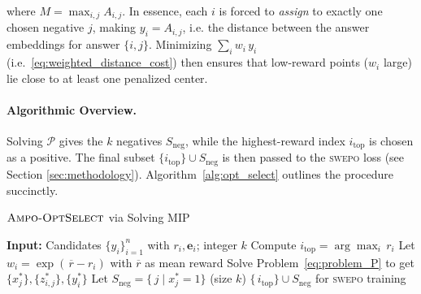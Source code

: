 \vspace{-0.1in}
where $M=\max_{i,j} A_{i,j}$. In essence, each $i$ is forced to \emph{assign} to exactly one chosen negative $j$, making $y_i = A_{i,j}$, i.e. the distance between the answer embeddings for answer $\{i,j\}$. Minimizing $\sum_i w_i\,y_i$ (i.e.\ \eqref{eq:weighted_distance_cost}) then ensures that low-reward points ($w_i$ large) lie close to at least one penalized center.

\vspace{-0.1in}
\paragraph{Algorithmic Overview.}
Solving $\mathcal{P}$ gives the $k$ negatives $S_{\mathrm{neg}}$, while the highest-reward index $i_{\mathrm{top}}$ is chosen as a positive. The final subset $\{i_{\mathrm{top}}\}\cup S_{\mathrm{neg}}$ is then passed to the \textsc{swepo} loss (see Section \ref{sec:methodology}). Algorithm~\ref{alg:opt_select} outlines the procedure succinctly.


\begin{algorithm}[t]
\caption{\textcolor{titlecolor}{$\textsc{Ampo-OptSelect}$ via Solving MIP}}
\label{alg:opt_select}
\begin{algorithmic}[1]
    \STATE \textcolor{inputcolor}{\textbf{Input:} Candidates $\{y_i\}_{i=1}^n$ with $r_i, \mathbf{e}_i$; integer $k$}
    \STATE \textcolor{mathcolor}{Compute $i_{\mathrm{top}} = \arg\max_i\,r_i$}
    \STATE \textcolor{mathcolor}{Let $w_i = \exp(\,\overline{r} - r_i)$ with $\overline{r}$ as mean reward}
    \STATE \textcolor{mathcolor}{Solve Problem~\eqref{eq:problem_P} to get $\{x_j^*\}, \{z_{i,j}^*\}, \{y_i^*\}$}
    \STATE \textcolor{mathcolor}{Let $S_{\mathrm{neg}} = \{\,j \mid x_j^*=1\}$ (size $k$)}
    \RETURN \textcolor{outputcolor}{$\{\,i_{\mathrm{top}}\}\cup S_{\mathrm{neg}}$ for \textsc{swepo} training}
\end{algorithmic}
\end{algorithm}



